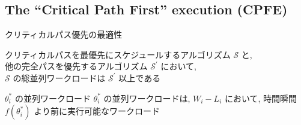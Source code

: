 

\subsection{The “Critical Path First” execution (CPFE)}
\label{ssec: CPEF}


\begin{frame}[label=theorem1]{クリティカルパス優先の最適性}
    \begin{theorem}[]
        クリティカルパスを最優先にスケジュールするアルゴリズム $\mathcal{S}$ と, \\他の完全パスを優先するアルゴリズム $\mathcal{S}^{\prime}$ において, \\$\mathcal{S}$ の総並列ワークロードは $\mathcal{S}^{\prime}$ 以上である
    \end{theorem}

    \begin{block}{$\theta_{i}^{*}$ の並列ワークロード}
        $\theta_{i}^{*}$ の並列ワークロードは, $W_{i}-L_{i}$ において, 時間瞬間 $f\left(\theta_{i}^{*}\right)$ より前に実行可能なワークロード
    \end{block}
\end{frame}

